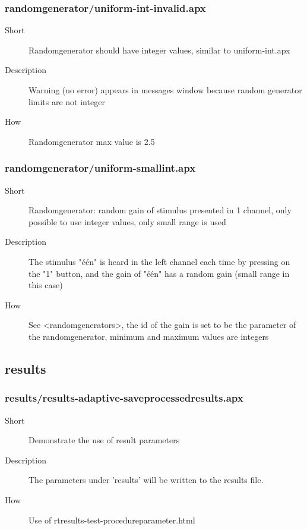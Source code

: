 \subsubsection{randomgenerator/uniform-int-invalid.apx}
\begin{description}
\item[Short] 
 Randomgenerator should have integer values, similar to uniform-int.apx
\item[Description] 
 Warning (no error) appears in messages window because random generator limits are not integer
\item[How] 
 Randomgenerator max value is 2.5
\end{description}

\subsubsection{randomgenerator/uniform-smallint.apx}
\begin{description}
\item[Short] 
 Randomgenerator: random gain of stimulus presented in 1 channel, only possible to use integer values, only small range is used
\item[Description] 
 The stimulus "één" is heard in the left channel each time by pressing on the "1" button, and the gain of "één" has a random gain (small range in this case)
\item[How] 
 See \textless{}randomgenerators\textgreater{}, the id of the gain is set to be the parameter of the randomgenerator, minimum and maximum values are integers
\end{description}

\subsection{results}
\subsubsection{results/results-adaptive-saveprocessedresults.apx}
\begin{description}
\item[Short] 
 Demonstrate the use of result parameters
\item[Description] 
 The parameters under 'results' will be written to the results file.
\item[How] 
 Use of rtresults-test-procedureparameter.html
\end{description}

